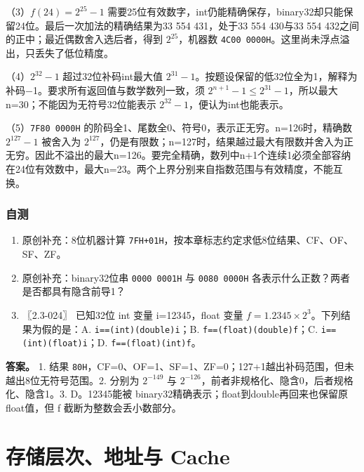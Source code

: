 （3）\(f(24)=2^{25}-1\) 需要25位有效数字，int仍能精确保存，binary32却只能保留24位。最后一次加法的精确结果为33 554 431，处于33 554 430与33 554 432之间的正中；最近偶数舍入选后者，得到 \(2^{25}\)，机器数 \allowbreak{}\texttt{4C00\ 0000H}。这里尚未浮点溢出，只丢失了低位精度。

（4）\(2^{32}-1\) 超过32位补码int最大值 \(2^{31}-1\)。按题设保留的低32位全为1，解释为补码−1。要求所有返回值与数学数列一致，须 \(2^{n+1}-1\le2^{31}-1\)，所以最大n=30；不能因为无符号32位能表示 \(2^{32}-1\)，便认为int也能表示。

（5）\allowbreak{}\texttt{7F80\ 0000H} 的阶码全1、尾数全0、符号0，表示正无穷。n=126时，精确数 \(2^{127}-1\) 被舍入为 \(2^{127}\)，仍是有限数；n=127时，结果越过最大有限数并舍入为正无穷。因此不溢出的最大n=126。要完全精确，数列中n+1个连续1必须全部容纳在24位有效数中，最大n=23。两个上界分别来自指数范围与有效精度，不能互换。

\subsection{自测}\label{co-self2}

\begin{enumerate}
\def\labelenumi{\arabic{enumi}.}
\tightlist
\item
  原创补充：8位机器计算 \allowbreak{}\texttt{7FH+01H}，按本章标志约定求低8位结果、CF、OF、SF、ZF。
\item
  原创补充：binary32位串 \allowbreak{}\texttt{0000\ 0001H} 与 \allowbreak{}\texttt{0080\ 0000H} 各表示什么正数？两者是否都具有隐含前导1？
\item
  〖2.3-024〗 已知32位 int 变量 i=12345，float 变量 \(f=1.2345\times2^3\)。下列结果为假的是：A. \allowbreak{}\texttt{i==(int)(double)i}；B. \allowbreak{}\texttt{f==(float)(double)f}；C. \allowbreak{}\texttt{i==(int)(float)i}；D. \allowbreak{}\texttt{f==(float)(int)f}。
\end{enumerate}

\textbf{答案。} 1. 结果 \allowbreak{}\texttt{80H}，CF=0、OF=1、SF=1、ZF=0；127+1越出补码范围，但未越出8位无符号范围。2. 分别为 \(2^{-149}\) 与 \(2^{-126}\)，前者非规格化、隐含0，后者规格化、隐含1。3. D。12345能被 binary32精确表示；float到double再回来也保留原float值，但 f 截断为整数会丢小数部分。

\chapter{存储层次、地址与 Cache}\label{co-ch3}

